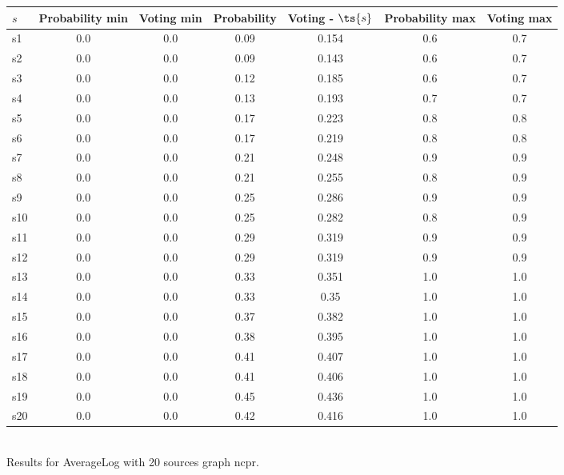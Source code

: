 \documentclass{article}
\begin{document}
\noindent\begin{tabular}{|l|c|c|c|c|c|c|}
\hline
$s$& Probability min & Voting min & Probability & Voting - $\ts{s}$ & Probability max & Voting max\\
\hline
s1 &0.0 & 0.0 & 0.09 & 0.154 & 0.6 & 0.7\\
\hline
s2 &0.0 & 0.0 & 0.09 & 0.143 & 0.6 & 0.7\\
\hline
s3 &0.0 & 0.0 & 0.12 & 0.185 & 0.6 & 0.7\\
\hline
s4 &0.0 & 0.0 & 0.13 & 0.193 & 0.7 & 0.7\\
\hline
s5 &0.0 & 0.0 & 0.17 & 0.223 & 0.8 & 0.8\\
\hline
s6 &0.0 & 0.0 & 0.17 & 0.219 & 0.8 & 0.8\\
\hline
s7 &0.0 & 0.0 & 0.21 & 0.248 & 0.9 & 0.9\\
\hline
s8 &0.0 & 0.0 & 0.21 & 0.255 & 0.8 & 0.9\\
\hline
s9 &0.0 & 0.0 & 0.25 & 0.286 & 0.9 & 0.9\\
\hline
s10 &0.0 & 0.0 & 0.25 & 0.282 & 0.8 & 0.9\\
\hline
s11 &0.0 & 0.0 & 0.29 & 0.319 & 0.9 & 0.9\\
\hline
s12 &0.0 & 0.0 & 0.29 & 0.319 & 0.9 & 0.9\\
\hline
s13 &0.0 & 0.0 & 0.33 & 0.351 & 1.0 & 1.0\\
\hline
s14 &0.0 & 0.0 & 0.33 & 0.35 & 1.0 & 1.0\\
\hline
s15 &0.0 & 0.0 & 0.37 & 0.382 & 1.0 & 1.0\\
\hline
s16 &0.0 & 0.0 & 0.38 & 0.395 & 1.0 & 1.0\\
\hline
s17 &0.0 & 0.0 & 0.41 & 0.407 & 1.0 & 1.0\\
\hline
s18 &0.0 & 0.0 & 0.41 & 0.406 & 1.0 & 1.0\\
\hline
s19 &0.0 & 0.0 & 0.45 & 0.436 & 1.0 & 1.0\\
\hline
s20 &0.0 & 0.0 & 0.42 & 0.416 & 1.0 & 1.0\\
\hline
\end{tabular}\\

\noindent Results for AverageLog with 20 sources graph ncpr.
\end{document}
